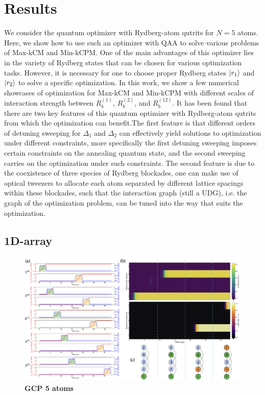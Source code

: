 \documentclass[%
 reprint,
nofootinbib,
 amsmath,amssymb,
 aps,
pra,
floatfix,
]{revtex4-2}
\begin{document}
\section{Results}

We consider the quantum optimizer with Rydberg-atom qutrits for $N = 5$ atoms. Here, we show how to use such an optimizer with QAA to solve various problems of Max-kCM and Min-kCPM. One of the main advantages of this optimizer lies in the variety of Rydberg states that can be chosen for various optimization tasks. However, it is necessary for one to choose proper Rydberg states $\ket{r_1}$ and $\ket{r_2}$ to solve a specific optimization. In this work, we show a few numerical showcases of optimization for Max-kCM and Min-kCPM with different scales of interaction strength between $R^{(1)}_b$, $R^{(2)}_b$, and $R^{(12)}_b$. It has been found that there are two key features of this quantum optimizer with Rydberg-atom qutrits from which the optimization can benefit.The first feature is that different orders of detuning sweeping for $\Delta_1$ and $\Delta_2$ can effectively yield solutions to optimization under different constraints, more specifically the first detuning sweeping imposes certain constraints on the annealing quantum state, and the second sweeping carries on the optimization under such constraints. The second feature is due to the coexistence of three species of Rydberg blockades, one can make use of optical tweezers to allocate each atom separated by different lattice spacings within these blockades, such that the interaction graph (still a UDG), i.e. the graph of the optimization problem, can be tuned into the way that suits the optimization. 


\subsection{1D-array}
\begin{figure}[t!]
    \centering
    \includegraphics[width=13cm]{picture/GCP_5atom.png}
    \caption{\textbf{GCP 5 atoms} }
    \label{fig:case1_ultimate}
\end{figure}
\end{document}
